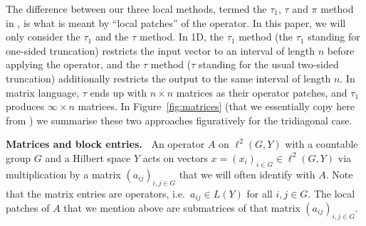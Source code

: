 \documentclass{article}
\newcommand\N{{\mathbb N}}
\newcommand\Z{{\mathbb Z}}
\newenvironment{remark}
 {\par\noindent\refstepcounter{theorem}{\bf Remark \thetheorem\ }}
 {\raisebox{1mm}{\framebox{}}\par\pagebreak[2]}
\numberwithin{equation}{section}   %
\numberwithin{figure}{section}  %
\begin{document}
The difference between our three local methods, termed the $\tau_1$, $\tau$ and $\pi$ method in \cite{CW.Heng.ML:JST}, is what is meant by ``local patches'' of the operator. In this paper, we will only consider the $\tau_1$ and the $\tau$ method.
In 1D, the $\tau_1$ method (the $\tau_1$ standing for one-sided truncation) restricts the input vector to an interval of length $n$ before applying the operator, and the $\tau$ method ($\tau$ standing for the usual two-sided truncation) additionally restricts the output to the same interval of length $n$.
In matrix language, $\tau$ ends up with $n\times n$ matrices as their operator patches, and $\tau_1$ produces $\infty\times n$ matrices.
%
In Figure~\ref{fig:matrices} (that we essentially copy here from \cite{CW.Heng.ML:JST}) we summarise these two approaches figuratively for the tridiagonal case.%

\medskip\noindent
{\bf Matrices and block entries.\ }
An operator $A$ on $\ell^2(G,Y)$ with a countable group $G$ and a Hilbert space $Y$ acts on vectors $x=(x_i)_{i\in G}\in\ell^2(G,Y)$ via multiplication by a matrix $(a_{ij})_{i,j\in G}$ that we will often identify with $A$. Note that the matrix entries are operators, i.e.\ $a_{ij}\in L(Y)$ for all $i,j\in G$.
The local patches of $A$ that we mention above are submatrices 
of that matrix $(a_{ij})_{i,j\in G}$.

\end{document}
